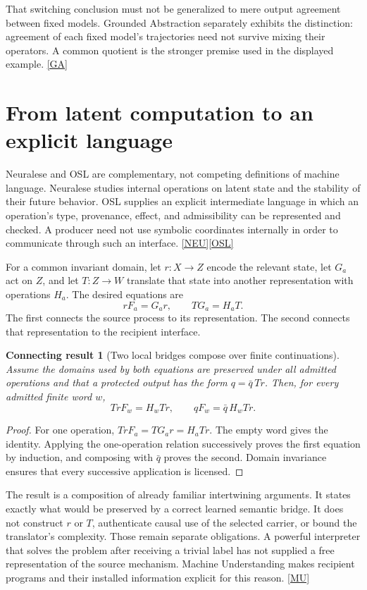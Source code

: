 \documentclass[11pt,oneside]{article}
\newcommand{\src}[1]{\hyperlink{cat:#1}{\textsf{[#1]}}}
\newtheorem{connection}{Connecting result}
\begin{document}
That switching conclusion must not be generalized to mere output agreement between fixed models. Grounded Abstraction separately exhibits the distinction: agreement of each fixed model's trajectories need not survive mixing their operators. A common quotient is the stronger premise used in the displayed example. \src{GA}

\section{From latent computation to an explicit language}
Neuralese and OSL are complementary, not competing definitions of machine language. Neuralese studies internal operations on latent state and the stability of their future behavior. OSL supplies an explicit intermediate language in which an operation's type, provenance, effect, and admissibility can be represented and checked. A producer need not use symbolic coordinates internally in order to communicate through such an interface. \src{NEU}\src{OSL}

For a common invariant domain, let $r:X\to Z$ encode the relevant state, let $G_a$ act on $Z$, and let $T:Z\to W$ translate that state into another representation with operations $H_a$. The desired equations are
\[
rF_a=G_ar,\qquad TG_a=H_aT.
\]
The first connects the source process to its representation. The second connects that representation to the recipient interface.

\begin{connection}[Two local bridges compose over finite continuations]
Assume the domains used by both equations are preserved under all admitted operations and that a protected output has the form $q=\bar q\,Tr$. Then, for every admitted finite word $w$,
\[
TrF_w=H_wTr,\qquad qF_w=\bar q\,H_wTr.
\]
\end{connection}
\begin{proof}
For one operation, $TrF_a=TG_ar=H_aTr$. The empty word gives the identity. Applying the one-operation relation successively proves the first equation by induction, and composing with $\bar q$ proves the second. Domain invariance ensures that every successive application is licensed.
\end{proof}

The result is a composition of already familiar intertwining arguments. It states exactly what would be preserved by a correct learned semantic bridge. It does not construct $r$ or $T$, authenticate causal use of the selected carrier, or bound the translator's complexity. Those remain separate obligations. A powerful interpreter that solves the problem after receiving a trivial label has not supplied a free representation of the source mechanism. Machine Understanding makes recipient programs and their installed information explicit for this reason. \src{MU}
\end{document}
